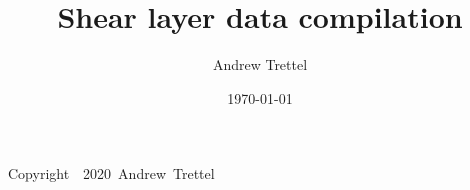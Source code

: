 \documentclass[12pt,oneside]{book}
\title{Shear layer data compilation}
\date{\today}
\author{Andrew Trettel}
\begin{document}
\frontmatter
\maketitle

\clearpage\null\vfill
\pagestyle{empty}
\begin{center}
Copyright~\textcopyright~2020~Andrew~Trettel
\end{center}

\tableofcontents
\mainmatter


\printbibliography
\appendix


\end{document}
